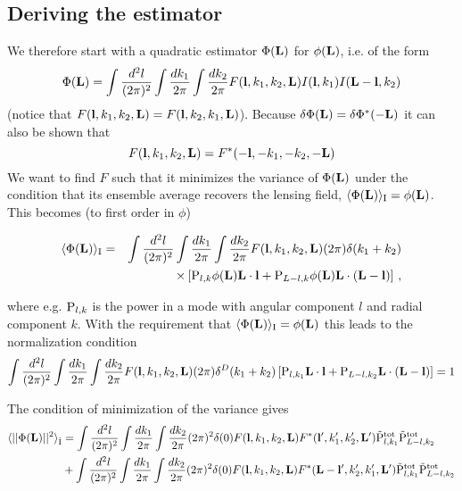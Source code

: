 \documentclass[12pt]{article}
\newcommand{\beq}{\begin{equation}}
\newcommand{\eeq}{\end{equation}}
\newcommand{\beqal}{\begin{aligned}}
\newcommand{\eeqal}{\end{aligned}}
\def\l{{\bf l}}
\def\L{{\bf L}}
\def\iul{{\rm I}}
\def\il{{\tilde{\rm I}}}
\def\pul{{\rm P}}
\def\ptot{{\tilde{\rm P}^{\rm tot}}}
\def\d2l{\frac{d^2l}{(2\pi)^2}}
\def\dko{\frac{dk_1}{2\pi}}
\def\dkt{\frac{dk_2}{2\pi}}
\numberwithin{equation}{section}
\begin{document}
%
%
%


\subsection{Deriving the estimator}
We therefore start with a quadratic estimator $\Phi(\L)$ for $\phi(\L)$,
i.e. of the form
\beq
\Phi (\L) = \int \d2l \int \dko \int \dkt F(\l,k_1,k_2,\L)
I(\l,k_1) I(\L-\l,k_2)
\label{eq:quadest}
\eeq
(notice that $F(\l,k_1,k_2,\L)=F(\l,k_2,k_1,\L)$). Because $\delta
\Phi(\L)=\delta \Phi^*(-\L)$ it can also be shown that
\beq
F(\l,k_1,k_2,\L) = F^*(-\l,-k_1,-k_2,-\L)
\eeq
We want to find $F$ such that it minimizes the variance of $\Phi(\L)$
under the condition that its ensemble average recovers the lensing field,
$\langle \Phi(\L)\rangle_\iul = \phi(\L)$. This becomes (to first order in $\phi$)

\beq
\beqal
\langle \Phi(\L)\rangle_\iul &=&  \int \d2l \int \dko \int \dkt  F(\l,k_1,k_2,\L)  (2\pi)\delta(k_1+k_2) \\
& & \times \left[\pul_{l,k} \phi(\L)\L\cdot\l + \pul_{L-l,k}  \phi(\L)\L\cdot(\L-\l)\right] \, ,
\eeqal
\eeq

where e.g. $\pul_{l,k}$ is the power in a mode with angular component $l$ and radial component $k$.
With the requirement that $\langle \Phi(\L)\rangle_\iul=\phi(\L)$ this
leads to the normalization condition
\beq
\int \d2l \int \dko \int \dkt F(\l,k_1,k_2,\L) (2\pi) \delta^D(k_1+k_2)
\left[\pul_{l,k_1}\L\cdot\l + \pul_{L-l,k_2} \L\cdot (\L-\l)\right] = 1
\label{eq:normcond}
\eeq

The condition of minimization of the variance gives 
\beq
\beqal
\langle ||\Phi(\L)||^2\rangle_\il &= \int \d2l \int \dko \int \dkt (2\pi)^2 \delta(0) F(\l,k_1,k_2,\L)
F^*(\l',k_1',k_2',\L') \ptot_{l,k_1}\ptot_{L-l,k_2} \\
&  + \int \d2l \int \dko \int \dkt (2\pi)^2 \delta(0) F(\l,k_1,k_2,\L)
F^*(\L-\l',k_2',k_1',\L') \ptot_{l,k_1}\ptot_{L-l,k_2}
\eeqal
\eeq
\end{document}
